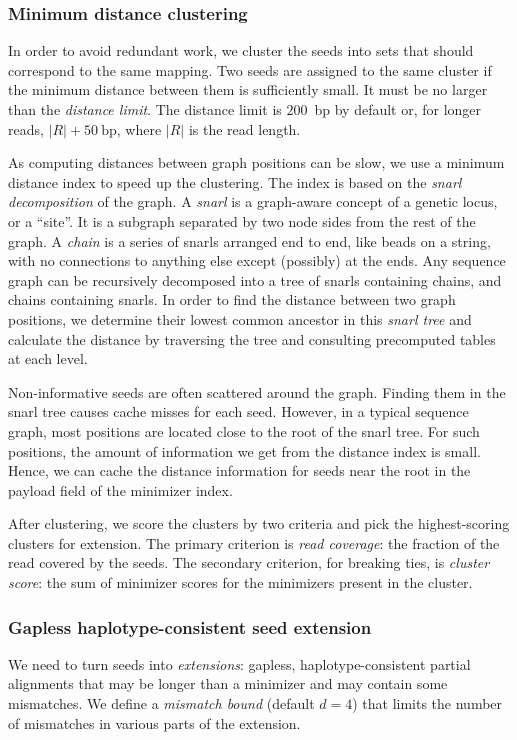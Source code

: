 \documentclass[11pt]{ucscthesis}
\newcommand{\param}[1]{\emph{#1}}
\newcommand{\vocab}[1]{\emph{#1}}
\begin{document}
\subsubsection{Minimum distance clustering}
\label{subsec:clustering}
In order to avoid redundant work, we cluster the seeds into sets that should correspond to the same mapping.
Two seeds are assigned to the same cluster if the minimum distance between them is sufficiently small. It must be no larger than the \param{distance limit}. The distance limit is $200$~bp by default or, for longer reads, $|R| + 50~\mathrm{bp}$, where $|R|$ is the read length.

As computing distances between graph positions can be slow, we use a minimum distance index \cite{chang_distance_2020} to speed up the clustering.
The index is based on the \vocab{snarl decomposition} of the graph.
A \vocab{snarl}\cite{paten_superbubbles_2018} is a graph-aware concept of a genetic locus, or a ``site''.
It is a subgraph separated by two node sides from the rest of the graph.
A \vocab{chain} is a series of snarls arranged end to end, like beads on a string, with no connections to anything else except (possibly) at the ends.
Any sequence graph can be recursively decomposed into a tree of snarls containing chains, and chains containing snarls.
In order to find the distance between two graph positions, we determine their lowest common ancestor in this \vocab{snarl tree} and calculate the distance by traversing the tree and consulting precomputed tables at each level.

Non-informative seeds are often scattered around the graph.
Finding them in the snarl tree causes cache misses for each seed.
However, in a typical sequence graph, most positions are located close to the root of the snarl tree.
For such positions, the amount of information we get from the distance index is small.
Hence, we can cache the distance information for seeds near the root in the payload field of the minimizer index.

After clustering, we score the clusters by two criteria and pick the highest-scoring clusters for extension.
The primary criterion is \vocab{read coverage}: the fraction of the read covered by the seeds.
The secondary criterion, for breaking ties, is \vocab{cluster score}: the sum of minimizer scores for the minimizers present in the cluster.

\subsubsection{Gapless haplotype-consistent seed extension}
\label{subsec:gapless-extension}
We need to turn seeds into \vocab{extensions}: gapless, haplotype-consistent partial alignments that may be longer than a minimizer and may contain some mismatches. We define a \param{mismatch bound} (default $d = 4$) that limits the number of mismatches in various parts of the extension.
\end{document}
